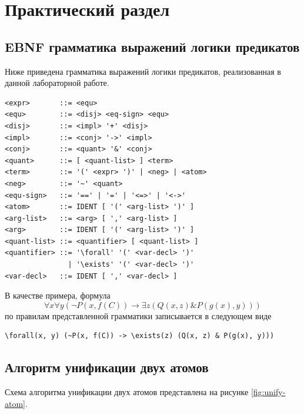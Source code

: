 \chapter{Практический раздел}

\section{EBNF грамматика выражений логики предикатов}

Ниже приведена грамматика выражений логики предикатов, реализованная в данной лабораторной работе.

\begin{verbatim}
<expr>       ::= <equ>
<equ>        ::= <disj> <eq-sign> <equ>
<disj>       ::= <impl> '+' <disj>
<impl>       ::= <conj> '->' <impl>
<conj>       ::= <quant> '&' <conj>
<quant>      ::= [ <quant-list> ] <term>
<term>       ::= '(' <expr> ')' | <neg> | <atom>
<neg>        ::= '~' <quant>
<equ-sign>   ::= '==' | '=' | '<=>' | '<->'
<atom>       ::= IDENT [ '(' <arg-list> ')' ]
<arg-list>   ::= <arg> [ ',' <arg-list> ]
<arg>        ::= IDENT [ '(' <arg-list> ')' ]
<quant-list> ::= <quantifier> [ <quant-list> ]
<quantifier> ::= '\forall' '(' <var-decl> ')'
               | '\exists' '(' <var-decl> ')'
<var-decl>   ::= IDENT [ ',' <var-decl> ]    
\end{verbatim}

В качестве примера, формула
\begin{equation*}
    \forall x \forall y (\neg P(x, f(C)) \rightarrow \exists z (Q(x, z) \& P(g(x), y)))
\end{equation*}
по правилам представленной грамматики записывается в следующем виде
\begin{verbatim}
\forall(x, y) (~P(x, f(C)) -> \exists(z) (Q(x, z) & P(g(x), y)))
\end{verbatim}

\clearpage

\section{Алгоритм унификации двух атомов}

Схема алгоритма унификации двух атомов представлена на рисунке \ref{fig:unify-atom}.

